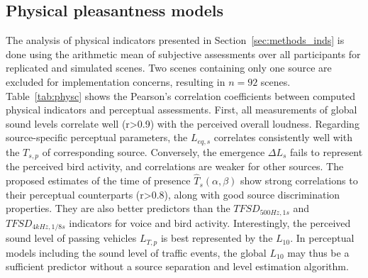 \documentclass[11pt,a4paper]{article}
\begin{document}
\subsection{Physical pleasantness models}
\label{sec:results_phys}

The analysis of physical indicators presented in Section~\ref{sec:methods_inds} is done using the arithmetic mean of subjective assessments over all participants for replicated and simulated scenes. Two scenes containing only one source are excluded for implementation concerns, resulting in $n=92$ scenes.\\

Table~\ref{tab:physc} shows the Pearson's correlation coefficients between computed physical indicators and perceptual assessments. First, all measurements of global sound levels correlate well (r>0.9) with the perceived overall loudness. Regarding source-specific perceptual parameters, the $L_{eq, s}$ correlates consistently well with the $T_{s, p}$ of corresponding source. Conversely, the emergence $\Delta L_s$ fails to represent the perceived bird activity, and correlations are weaker for other sources. The proposed estimates of the time of presence $\hat T_s(\alpha, \beta)$ show strong correlations to their perceptual counterparts (r>0.8), along with good source discrimination properties. They are also better predictors than the $TFSD_{500Hz, 1s}$ and $TFSD_{4kHz, 1/8s}$ indicators for voice and bird activity. Interestingly, the perceived sound level of passing vehicles $L_{T, p}$ is best represented by the $L_{10}$. In perceptual models including the sound level of traffic events, the global $L_{10}$ may thus be a sufficient predictor without a source separation and level estimation algorithm.\\
\end{document}
